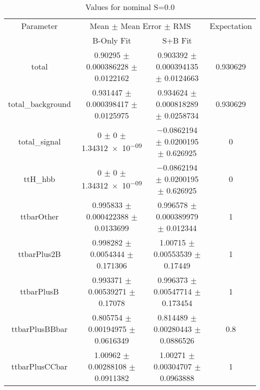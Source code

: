 \begin{table}
\centering
\caption{Values for nominal S=0.0}
\begin{tabular}{cccc}
\toprule
Parameter & \multicolumn{2}{c}{Mean $\pm$ Mean Error $\pm$ RMS} & Expectation\\
 & B-Only Fit & S+B Fit & \\
\midrule
total & \num{0.90295} $\pm$ \num{0.000386228} $\pm$ \num{0.0122162} & \num{0.903392} $\pm$ \num{0.000394135} $\pm$ \num{0.0124663} & \num{0.930629}\\
total\_background & \num{0.931447} $\pm$ \num{0.000398417} $\pm$ \num{0.0125975} & \num{0.934624} $\pm$ \num{0.000818289} $\pm$ \num{0.0258734} & \num{0.930629}\\
total\_signal & \num{0} $\pm$ \num{0} $\pm$ \num{1.34312e-09} & \num{-0.0862194} $\pm$ \num{0.0200195} $\pm$ \num{0.626925} & \num{0}\\
ttH\_hbb & \num{0} $\pm$ \num{0} $\pm$ \num{1.34312e-09} & \num{-0.0862194} $\pm$ \num{0.0200195} $\pm$ \num{0.626925} & \num{0}\\
ttbarOther & \num{0.995833} $\pm$ \num{0.000422388} $\pm$ \num{0.0133699} & \num{0.996578} $\pm$ \num{0.000389979} $\pm$ \num{0.012344} & \num{1}\\
ttbarPlus2B & \num{0.998282} $\pm$ \num{0.0054344} $\pm$ \num{0.171306} & \num{1.00715} $\pm$ \num{0.00553539} $\pm$ \num{0.17449} & \num{1}\\
ttbarPlusB & \num{0.993371} $\pm$ \num{0.00539271} $\pm$ \num{0.17078} & \num{0.996373} $\pm$ \num{0.00547714} $\pm$ \num{0.173454} & \num{1}\\
ttbarPlusBBbar & \num{0.805754} $\pm$ \num{0.00194975} $\pm$ \num{0.0616349} & \num{0.814489} $\pm$ \num{0.00280443} $\pm$ \num{0.0886526} & \num{0.8}\\
ttbarPlusCCbar & \num{1.00962} $\pm$ \num{0.00288108} $\pm$ \num{0.0911382} & \num{1.00271} $\pm$ \num{0.00304707} $\pm$ \num{0.0963888} & \num{1}\\
\bottomrule
\end{tabular}
\end{table}